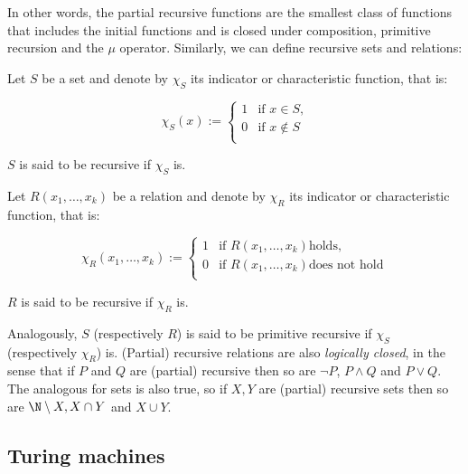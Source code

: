\documentclass[../main.tex]{memoir}
\begin{document}
In other words, the partial recursive functions are the smallest class of functions that includes the initial functions and is closed under composition, primitive recursion and the $\mu$ operator. Similarly, we can define recursive sets and relations:

\begin{definition}
  Let $S$ be a set and denote by $\chi_S$ its indicator or characteristic function, that is:

  \begin{equation*}
    \chi_S(x) := \left\{
    \begin{array}{lr}
      1 & \text{if } x \in S \text{,} \\
      0 & \text{if } x \not\in S \\
    \end{array}\right.
  \end{equation*}

  $S$ is said to be recursive if $\chi_S$ is.
\end{definition}

\begin{definition}
  Let $R(x_1, \ldots, x_k)$ be a relation and denote by $\chi_R$ its indicator or characteristic function, that is:

  \begin{equation*}
    \chi_R(x_1, \ldots, x_k) := \left\{
    \begin{array}{lr}
      1 & \text{if } R(x_1, \ldots, x_k) \text{holds,} \\
      0 & \text{if } R(x_1, \ldots, x_k) \text{does not hold} \\
    \end{array}\right.
  \end{equation*}

  $R$ is said to be recursive if $\chi_R$ is.
\end{definition}

Analogously, $S$ (respectively $R$) is said to be primitive recursive if $\chi_S$ (respectively $\chi_R$) is. (Partial) recursive relations are also \textit{logically closed}, in the sense that if $P$ and $Q$ are (partial) recursive then so are $\neg P$, $P \land Q$ and $P \lor Q$. The analogous for sets is also true, so if $X, Y$ are (partial) recursive sets then so are $\N \setminus X, X \cap Y$ and $X \cup Y$.

\subsection{Turing machines}
\end{document}
